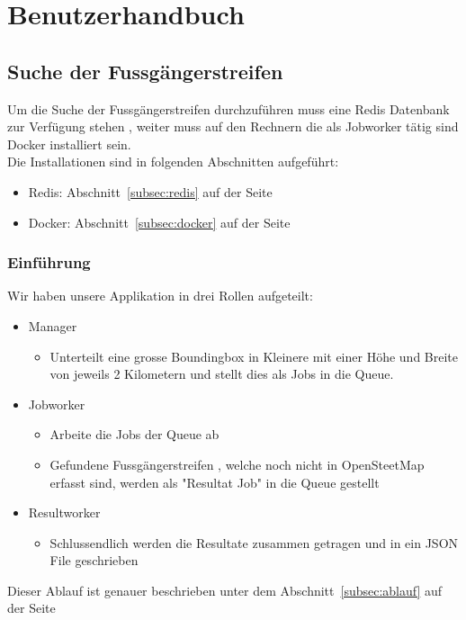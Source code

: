 \section{Benutzerhandbuch}
\subsection{Suche der Fussgängerstreifen}
Um die Suche der Fussgängerstreifen durchzuführen muss eine Redis Datenbank zur Verfügung stehen , weiter muss auf den Rechnern die als Jobworker tätig sind Docker installiert sein. \\
Die Installationen sind in folgenden Abschnitten aufgeführt:
\begin{itemize}
	\item Redis:  Abschnitt~\ref{subsec:redis} auf der Seite~\pageref{subsec:redis}
	\item Docker: Abschnitt~\ref{subsec:docker} auf der Seite~\pageref{subsec:docker}
\end{itemize}

\subsubsection{Einführung}
Wir haben unsere Applikation in drei Rollen aufgeteilt:
\begin{itemize}
	\item Manager
	\begin{itemize}
		\item Unterteilt eine grosse Boundingbox in Kleinere mit einer Höhe und Breite von jeweils 2 Kilometern und stellt dies als Jobs in die Queue.
	\end{itemize}
	\item Jobworker
	\begin{itemize}
		\item Arbeite die Jobs der Queue ab
		\item Gefundene Fussgängerstreifen , welche noch nicht in OpenSteetMap erfasst sind, werden als "Resultat Job" in die Queue gestellt
	\end{itemize}
	\item Resultworker
	\begin{itemize}
		\item Schlussendlich werden die Resultate zusammen getragen und in ein JSON File geschrieben
	\end{itemize}
\end{itemize}

Dieser Ablauf ist genauer beschrieben unter dem Abschnitt~\ref{subsec:ablauf} auf der Seite~\pageref{subsec:ablauf}
\newpage

